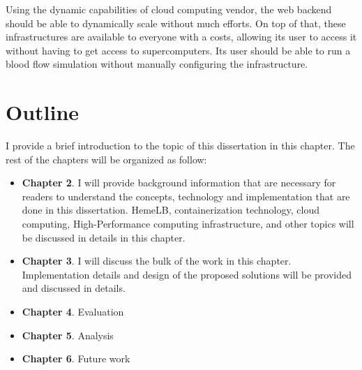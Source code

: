 Using the dynamic capabilities of cloud computing vendor, the web backend should be able to dynamically scale without much efforts. On top of that, these infrastructures are available to everyone with a costs, allowing its user to access it without having to get access to supercomputers. Its user should be able to run a blood flow simulation without manually configuring the infrastructure.



\section{Outline}
I provide a brief introduction to the topic of this dissertation in this chapter. The rest of the chapters will be organized as follow:
\begin{itemize}
    \item \textbf{Chapter 2}. I will provide background information that are necessary for readers to understand the concepts, technology and implementation that are done in this dissertation. HemeLB, containerization technology, cloud computing, High-Performance computing infrastructure, and other topics will be discussed in details in this chapter.
    \item \textbf{Chapter 3}. I will discuss the bulk of the work in this chapter. Implementation details and design of the proposed solutions will be provided and discussed in details.
    \item \textbf{Chapter 4}. Evaluation
    \item \textbf{Chapter 5}. Analysis
    \item \textbf{Chapter 6}. Future work
\end{itemize}
